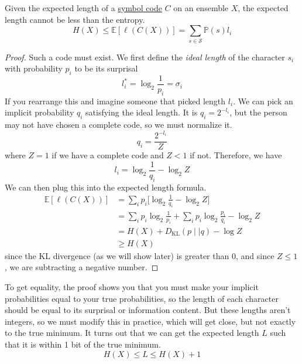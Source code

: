     \begin{theorem}
      \label{thm:ideal-code-lengths}
      Given the expected length of a \hyperref[def:symbol-code]{symbol code} $C$ on an ensemble $X$, the expected length cannot be less than the entropy. 
      \begin{equation}
        H(X) \leq \mathbb{E}[\ell(C(X))] = \sum_{s \in \mathcal{S}} \mathbb{P}(s) l_i
      \end{equation}
    \end{theorem}
    \begin{proof}
      Such a code must exist. We first define the \textit{ideal length} of the character $s_i$ with probability $p_i$ to be its surprisal 
      \begin{equation}
        l_i^\ast = \log_2 \frac{1}{p_i} = \sigma_i
      \end{equation}
      If you rearrange this and imagine someone that picked length $l_i$. We can pick an implicit probability $q_i$ satisfying the ideal length.  It is $q_i = 2^{-l_i}$, but the person may not have chosen a complete code, so we must normalize it. 
      \begin{equation}
        q_i = \frac{2^{-l_i}}{Z}
      \end{equation}
      where $Z = 1$ if we have a complete code and $Z < 1$ if not. Therefore, we have 
      \begin{equation}
        l_i = \log_2 \frac{1}{q_i} - \log_2 Z 
      \end{equation}
      We can then plug this into the expected length formula. 
      \begin{align*}
        \mathbb{E}[\ell(C(X))] & = \sum_i p_i \bigg[ \log_2 \frac{1}{q_i} - \log_2 Z \bigg] \\
                               & = \sum_i p_i \log_2 \frac{1}{p_i} + \sum_i p_i \log_2 \frac{p_i}{q_i} - \log_2 Z \\
                               & = H(X) + D_{\mathrm{KL}} (p \mid \mid q) - \log Z \\
                               & \geq H(X)
      \end{align*}
      since the KL divergence (as we will show later) is greater than $0$, and since $Z \leq 1$, we are subtracting a negative number. 
    \end{proof}

    To get equality, the proof shows you that you must make your implicit probabilities equal to your true probabilities, so the length of each character should be equal to its surprisal or information content. But these lengths aren't integers, so we must modify this in practice, which will get close, but not exactly to the true minimum. It turns out that we can get the expected length $L$ such that it is within 1 bit of the true minimum. 
    \begin{equation}
      H(X) \leq L \leq H(X) + 1
    \end{equation}

